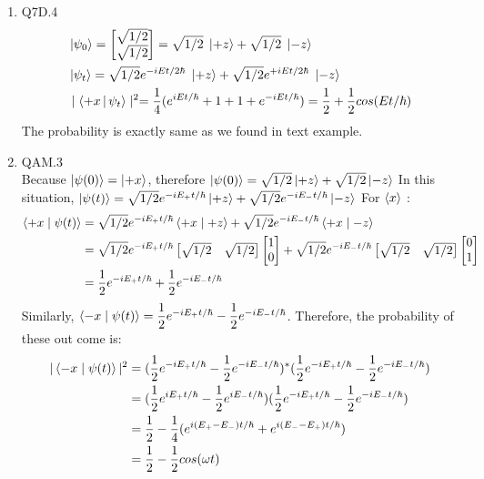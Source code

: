 \documentclass{article}
\providecommand{\Matrix}[1] {\begin{bmatrix} #1 \end{bmatrix}}
\theoremstyle{definition}
\theoremstyle{plain}
\begin{document}
\begin {enumerate}[itemindent=30pt,label=\bf Exercise {\arabic*}:]
\item Q7D.4\\
\begin{align*}
	&\Ket{\psi_{0}} = \Matrix{\sqrt{1/2} \\ \sqrt{1/2}} = \sqrt{1/2}\; \Ket{+z} + \sqrt{1/2} \;\Ket{-z}\\
	& \Ket{\psi_{t}} = \sqrt{1/2}e^{-iEt/2\hbar}\; \Ket{+z} + \sqrt{1/2}e^{+iEt/2\hbar} \;\Ket{-z}\\
	&\mid \Braket{+x | \psi_{t}} \mid^2 = \dfrac{1}{4} (e^{iEt/\hbar} + 1 + 1 + e^{-iEt/\hbar}) = \dfrac{1}{2} + \dfrac{1}{2} cos(Et/\hbar)
\end{align*}
\subitem The probability is exactly same as we found in text example.
\item QAM.3\\
\subitem Because $\Ket{\psi(0)} = \Ket{+x}$, therefore  $\ket{\psi(0)} = \sqrt{1/2}\Ket{+z} + \sqrt{1/2}\Ket{-z}$
\subitem In this situation, $\ket{\psi(t)} = \sqrt{1/2} e^{-iE_{+}t/\hbar}\Ket{+z} + \sqrt{1/2} e^{-iE_{-}t/\hbar}\Ket{-z}$
\subitem For $\Braket{x}$ :
\begin{align*}
	\Braket{+x \mid \psi(t)} &= \sqrt{1/2} e^{-iE_{+}t/\hbar}\Braket{+x \mid +z} + \sqrt{1/2} e^{-iE_{-}t/\hbar}\Braket{+x \mid -z}\\
	&= \sqrt{1/2} e^{-iE_{+}t/\hbar}\Matrix{\sqrt{1/2} & \sqrt{1/2}} \Matrix{1 \\ 0}+ \sqrt{1/2} e^{-iE_{-}t/\hbar}\Matrix{\sqrt{1/2} & \sqrt{1/2}} \Matrix{0 \\ 1}\\
	&= \dfrac{1}{2} e^{-iE_{+}t/\hbar}+ \dfrac{1}{2} e^{-iE_{-}t/\hbar}
\end{align*}
\subitem Similarly, $\Braket{-x \mid \psi(t)} = \dfrac{1}{2} e^{-iE_{+}t/\hbar} - \dfrac{1}{2} e^{-iE_{-}t/\hbar}$. Therefore, the probability of these out come is:
\begin{align*}
	|\Braket{-x \mid \psi(t)}|^{2} &= (\dfrac{1}{2} e^{-iE_{+}t/\hbar}- \dfrac{1}{2} e^{-iE_{-}t/\hbar})^{*}(\dfrac{1}{2} e^{-iE_{+}t/\hbar}- \dfrac{1}{2} e^{-iE_{-}t/\hbar})\\ 
	&=(\dfrac{1}{2} e^{iE_{+}t/\hbar} - \dfrac{1}{2} e^{iE_{-}t/\hbar})(\dfrac{1}{2} e^{-iE_{+}t/\hbar}- \dfrac{1}{2} e^{-iE_{-}t/\hbar})\\ 
	&= \dfrac{1}{2} - \dfrac{1}{4}( e^{i(E_{+} - E_{-})t/\hbar} + e^{i(E_{-} - E_{+})t/\hbar})\\
	&= \dfrac{1}{2} - \dfrac{1}{2} cos(\omega t)
\end{align*}
\begin{align*}

\end{align*}
\end{enumerate}
\end{document}
